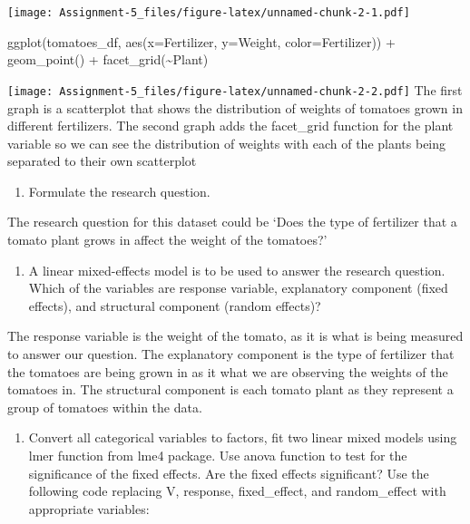 \documentclass[
]{article}
\newenvironment{Shaded}{\begin{snugshade}}{\end{snugshade}}
\newcommand{\AttributeTok}[1]{\textcolor[rgb]{0.77,0.63,0.00}{#1}}
\newcommand{\FunctionTok}[1]{\textcolor[rgb]{0.00,0.00,0.00}{#1}}
\newcommand{\NormalTok}[1]{#1}
\newcommand{\SpecialCharTok}[1]{\textcolor[rgb]{0.00,0.00,0.00}{#1}}
\providecommand{\tightlist}{%
  \setlength{\itemsep}{0pt}\setlength{\parskip}{0pt}}
\begin{document}
\texttt{[image: Assignment-5\_files/figure-latex/unnamed-chunk-2-1.pdf]}

\begin{Shaded}
\begin{Highlighting}[]
\FunctionTok{ggplot}\NormalTok{(tomatoes\_df, }\FunctionTok{aes}\NormalTok{(}\AttributeTok{x=}\NormalTok{Fertilizer, }\AttributeTok{y=}\NormalTok{Weight, }\AttributeTok{color=}\NormalTok{Fertilizer)) }\SpecialCharTok{+} \FunctionTok{geom\_point}\NormalTok{() }\SpecialCharTok{+}
\FunctionTok{facet\_grid}\NormalTok{(}\SpecialCharTok{\textasciitilde{}}\NormalTok{Plant)}
\end{Highlighting}
\end{Shaded}

\texttt{[image: Assignment-5\_files/figure-latex/unnamed-chunk-2-2.pdf]}
The first graph is a scatterplot that shows the distribution of weights
of tomatoes grown in different fertilizers. The second graph adds the
facet\_grid function for the plant variable so we can see the
distribution of weights with each of the plants being separated to their
own scatterplot

\begin{enumerate}
\def\labelenumi{\alph{enumi}.}
\setcounter{enumi}{2}
\tightlist
\item
  Formulate the research question.
\end{enumerate}

The research question for this dataset could be `Does the type of
fertilizer that a tomato plant grows in affect the weight of the
tomatoes?'

\begin{enumerate}
\def\labelenumi{\alph{enumi}.}
\setcounter{enumi}{3}
\tightlist
\item
  A linear mixed-effects model is to be used to answer the research
  question. Which of the variables are response variable, explanatory
  component (fixed effects), and structural component (random effects)?
\end{enumerate}

The response variable is the weight of the tomato, as it is what is
being measured to answer our question. The explanatory component is the
type of fertilizer that the tomatoes are being grown in as it what we
are observing the weights of the tomatoes in. The structural component
is each tomato plant as they represent a group of tomatoes within the
data.

\begin{enumerate}
\def\labelenumi{\alph{enumi}.}
\setcounter{enumi}{4}
\tightlist
\item
  Convert all categorical variables to factors, fit two linear mixed
  models using lmer function from lme4 package. Use anova function to
  test for the significance of the fixed effects. Are the fixed effects
  significant? Use the following code replacing V, response,
  fixed\_effect, and random\_effect with appropriate variables:
\end{enumerate}
\end{document}
